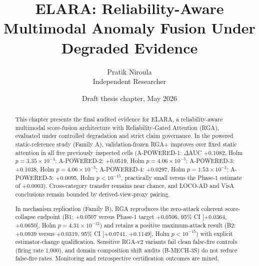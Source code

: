 \documentclass[11pt]{article}
\title{\textbf{ELARA: Reliability-Aware Multimodal Anomaly Fusion Under Degraded Evidence}}
\author{Pratik Niroula\\Independent Researcher}
\date{Draft thesis chapter, May 2026}
\begin{document}
\maketitle

\begin{abstract}
This chapter presents the final audited evidence for ELARA, a reliability-aware multimodal score-fusion architecture with Reliability-Gated Attention (RGA), evaluated under controlled degradation and strict claim governance. In the powered static-reference study (Family A), validation-frozen RGA+ improves over fixed static attention in all five previously inspected cells (A-POWERED-1: $\Delta$AUC +0.1082, Holm $p = 3.35\times 10^{-4}$; A-POWERED-2: +0.0519, Holm $p = 4.06\times 10^{-5}$; A-POWERED-3: +0.1038, Holm $p = 4.06\times 10^{-5}$; A-POWERED-4: +0.0297, Holm $p = 1.53\times 10^{-3}$; A-POWERED-5: +0.0095, Holm $p < 10^{-15}$, practically small versus the Phase-1 estimate of +0.0003). Cross-category transfer remains near chance, and LOCO-AD and VisA conclusions remain bounded by derived-view-proxy pairing.

In mechanism replication (Family B), RGA reproduces the zero-attack coherent score-collapse endpoint (B1: +0.0507 versus Phase-1 target +0.0506, 95\% CI [+0.0364, +0.0650], Holm $p = 4.31\times 10^{-12}$) and retains a positive maximum-attack result (B2: +0.0939 versus +0.0319, 95\% CI [+0.0741, +0.1149], Holm $p < 10^{-15}$) with explicit estimator-change qualification. Sensitive RGA-v2 variants fail clean false-fire controls (firing rate 1.000), and domain composition shift audits (B-MECH-3S) do not reduce false-fire rates. Monitoring and retrospective certification outcomes are mixed.


\end{abstract}
\end{document}

